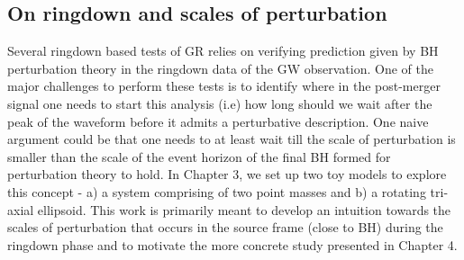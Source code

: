
\subsection{On ringdown and scales of perturbation}
Several ringdown based tests of GR relies on verifying prediction given by BH perturbation theory in the ringdown data of the GW observation. One of the major challenges to perform these tests is to identify where in the post-merger signal one needs to start this analysis (i.e) how long should we wait after the peak of the waveform before it admits a perturbative description. One naive argument could be that one needs to at least wait till the scale of perturbation is smaller than the scale of the event horizon of the final BH formed for perturbation theory to hold. In Chapter 3, we set up two toy models to explore this concept - a) a system comprising of two point masses and b) a rotating tri-axial ellipsoid.  This work is primarily meant to develop an intuition towards the scales of perturbation that occurs in the source frame (close to BH) during the ringdown phase and to motivate the more concrete study presented in Chapter 4. 






